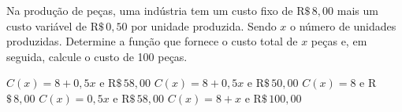 Na produção de peças, uma indústria tem um custo fixo de R$\$\,8{,}00$ mais um custo variável de R$\$\,0{,}50$ por unidade produzida. Sendo $x$ o número de unidades produzidas. Determine a função que fornece o custo total de $x$ peças e, em seguida, calcule o custo de 100 peças.

$C(x)=8+0{,}5x$ \quad e \quad R$\$\,58{,}00$
$C(x)=8+0{,}5x$ \quad e \quad R$\$\,50{,}00$
$C(x)=8$ \quad e \quad R$\$\,8{,}00$
$C(x)=0{,}5x$ \quad e \quad R$\$\,58{,}00$
$C(x)=8+x$ \quad e \quad R$\$\,100{,}00$



